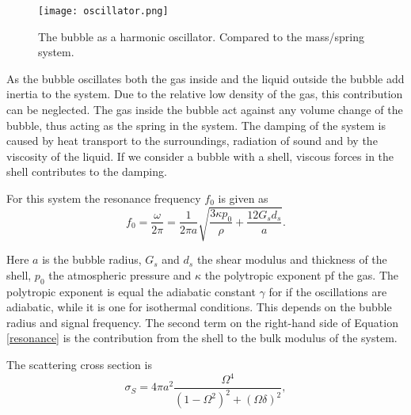 \begin{figure}[h]
  \centering
  \label{Fig:oscillator}
  \texttt{[image: oscillator.png]}
  \caption{The bubble as a harmonic oscillator. Compared to the mass/spring system\cite{Hoff2000}.}
\end{figure} 

As the bubble oscillates both the gas inside and the liquid outside the bubble add inertia to the system. Due to the relative low density of the gas, this contribution can be neglected. The gas inside the bubble act against any volume change of the bubble, thus acting as the spring in the system. The damping of the system is caused by heat transport to the surroundings, radiation of sound and by the viscosity of the liquid. If we consider a bubble with a shell, viscous forces in the shell contributes to the damping. 

%
%

For this system the resonance frequency $f_0$ is given as \cite{Hoff2000}
\begin{equation}
\label{resonance}
f_0 = \frac{\omega}{2 \pi}= \frac{1}{2 \pi a} \sqrt{\frac{3\kappa p_0}{\rho}+ \frac{12 G_s d_s}{a}}.
\end{equation} 

Here $a$ is the bubble radius, $G_s$ and $d_s$ the shear modulus and thickness of the shell, $p_0$ the atmospheric pressure and $\kappa$ the polytropic exponent pf the gas. The polytropic exponent is equal the adiabatic constant $\gamma$ for if the oscillations are adiabatic, while it is one for isothermal conditions. This depends on the bubble radius and signal frequency\cite{Hoff2000}. The second term on the right-hand side of Equation \eqref{resonance} is the contribution from the shell to the bulk modulus of the system. 

The scattering cross section is 
\begin{equation}
\label{eq:cross section}
\sigma_S = 4\pi a^2 \frac{\Omega^4}{(1-\Omega^2)^2 + (\Omega \delta)^2}, 
\end{equation}


